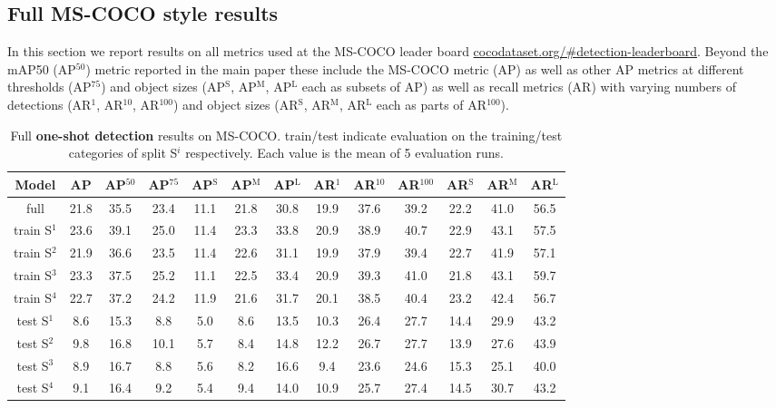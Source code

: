 \documentclass{article}
\newcommand{\coco}{MS-COCO\xspace}
\begin{document}
\subsection{Full \coco style results}

In this section we report results on all metrics used at the \coco leader board \url{cocodataset.org/\#detection-leaderboard}. Beyond the mAP50 (AP$^{50}$) metric reported in the main paper these include the \coco metric (AP) as well as other AP metrics at different thresholds (AP$^{75}$) and object sizes (AP$^\text{S}$, AP$^\text{M}$, AP$^\text{L}$ each as subsets of AP) as well as recall metrics (AR) with varying numbers of detections (AR$^{1}$, AR$^{10}$, AR$^{100}$) and object sizes (AR$^\text{S}$, AR$^\text{M}$, AR$^\text{L}$ each as parts of AR$^{100}$).

\begin{table}[h]
\begin{center}
\begin{small}
\begin{tabular}{c|ccc|ccc|ccc|ccc}
Model & AP & AP$^{50}$ & AP$^{75}$ & AP$^\text{S}$ & AP$^\text{M}$ & AP$^\text{L}$ & AR$^{1}$ & AR$^{10}$ & AR$^{100}$ & AR$^\text{S}$ & AR$^\text{M}$ & AR$^\text{L}$\\
\hline
full & 21.8 & 35.5 & 23.4 & 11.1 & 21.8 & 30.8 & 19.9 & 37.6 & 39.2 & 22.2 & 41.0 & 56.5 \\
\hline
train S$^1$ & 23.6 & 39.1 & 25.0 & 11.4 & 23.3 & 33.8 & 20.9 & 38.9 & 40.7 & 22.9 & 43.1 & 57.5 \\
train S$^2$ & 21.9 & 36.6 & 23.5 & 11.4 & 22.6 & 31.1 & 19.9 & 37.9 & 39.4 & 22.7 & 41.9 & 57.1 \\
train S$^3$ & 23.3 & 37.5 & 25.2 & 11.1 & 22.5 & 33.4 & 20.9 & 39.3 & 41.0 & 21.8 & 43.1 & 59.7 \\
train S$^4$ & 22.7 & 37.2 & 24.2 & 11.9 & 21.6 & 31.7 & 20.1 & 38.5 & 40.4 & 23.2 & 42.4 & 56.7 \\
\hline
test S$^1$ & 8.6 & 15.3 & 8.8 & 5.0 & 8.6 & 13.5 & 10.3 & 26.4 & 27.7 & 14.4 & 29.9 & 43.2 \\
test S$^2$ & 9.8 & 16.8 & 10.1 & 5.7 & 8.4 & 14.8 & 12.2 & 26.7 & 27.7 & 13.9 & 27.6 & 43.9 \\
test S$^3$ & 8.9 & 16.7 & 8.8 & 5.6 & 8.2 & 16.6 & 9.4 & 23.6 & 24.6 & 15.3 & 25.1 & 40.0 \\
test S$^4$ & 9.1 & 16.4 & 9.2 & 5.4 & 9.4 & 14.0 & 10.9 & 25.7 & 27.4 & 14.5 & 30.7 & 43.2
\end{tabular}
\end{small}
\end{center}
\caption{Full \textbf{one-shot detection} results on \coco. train/test indicate evaluation on the training/test categories of split S$^i$ respectively. Each value is the mean of 5 evaluation runs.}
\vspace{-12pt}
\label{table:extended_one-shot_detection_results}
\end{table}
\end{document}
